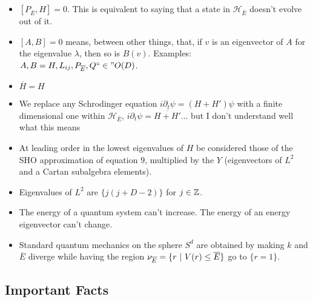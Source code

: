\documentclass{article}
\newcommand{\cut}[1]{\overline{#1}}
\begin{document}
    \begin{itemize}

    \item $[P_{\cut E}, H] = 0$. This is equivalent to saying that a state in $\mathcal H_{\cut E}$ doesn't evolve out of it.
    
    \item $[A, B] = 0$ means, between other things, that, if $v$ is an eigenvector of $A$ for the eigenvalue $\lambda$, then so is $B(v)$. Examples: $A, B = H, L_{ij}, P_{\cut E}, Q ``\in" O(D)$.
    
    \item $\cut H = H$
    
    \item We replace any Schrodinger equation $i \partial_t \psi = (H + H')\psi$ with a finite dimensional one within $\mathcal H_{\cut E}$, $i \partial_t \psi = \cut{H + H'}$... but I don't understand well what this means
    
    \item At leading order in  the lowest eigenvalues of $H$ be considered those of the SHO approximation of equation $9$, multiplied by the $Y$ (eigenvectors of $L^2$ and a Cartan subalgebra elements).
    
    \item Eigenvalues of $L^2$ are $\{j(j+D-2)\}$ for $j \in \mathbb{Z}$.
    
    \item The energy of a quantum system can't increase. The energy of an energy eigenvector can't change.
    
    \item Standard quantum mechanics on the sphere $S^d$ are obtained by making $k$ and $\cut E$ diverge while having the region $\nu_{\cut E} = \{r \st V(r) \leq \cut E\}$ go to $\{r = 1\}$.
    
    \end{itemize}

\subsection*{Important Facts}
\end{document}
